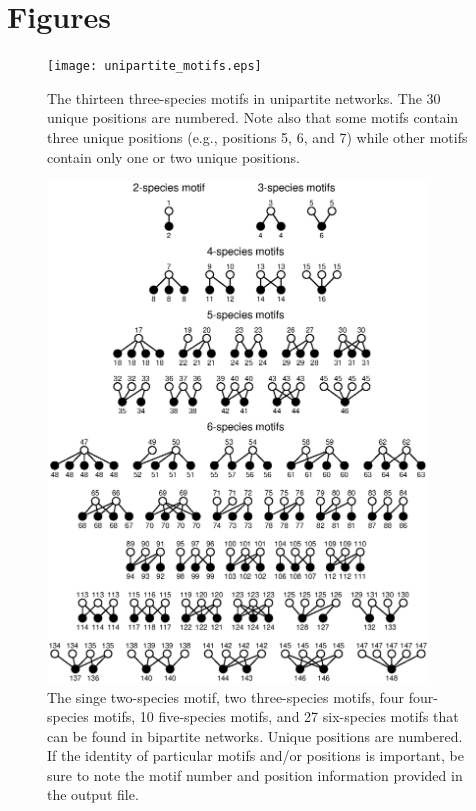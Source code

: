 \documentclass[12pt]{article}
\begin{document}
\clearpage

\section{Figures}

	\begin{figure}[ht]
	  \centering
		\texttt{[image: unipartite\_motifs.eps]}
		\caption{The thirteen three-species motifs in unipartite networks. The 30 unique positions are numbered. Note also that some motifs contain three unique positions (e.g., positions 5, 6, and 7) while other motifs contain only one or two unique positions.}
		\label{fig:3sp_unipartite}
	\end{figure}


	\begin{figure}[ht]
	  \centering
		\includegraphics*[width=0.9\textwidth]{bipartite_motifs.eps}
			  \vspace{0.5cm}
		\caption{The singe two-species motif, two three-species motifs, four four-species motifs, 10 five-species motifs, and 27 six-species motifs that can be found in bipartite networks. Unique positions are numbered. If the identity of particular motifs and/or positions is important, be sure to note the motif number and position information provided in the output file.}
		\label{bipartite_motifs}
	\end{figure}

\clearpage




\clearpage
\end{document}

